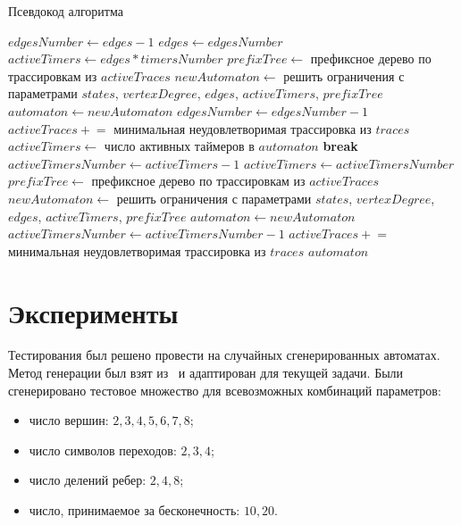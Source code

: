 \documentclass[times,specification,annotation]{itmo-student-thesis}
\begin{document}
\begin{algorithm}[!h]
\caption{Псевдокод алгоритма}\label{lst2}
\begin{algorithmic}[1]
		\State $edgesNumber \gets edges - 1$
		\Loop \label{lst:line:start3}
			\State $edges \gets edgesNumber$
			\State $activeTimers \gets edges * timersNumber$
			\State $prefixTree \gets$ префиксное дерево по трассировкам из $activeTraces$
			\State $newAutomaton \gets$ решить ограничения с параметрами $states$, $vertexDegree$, $edges$, $activeTimers$, $prefixTree$
					\State $automaton \gets newAutomaton$
					\State $edgesNumber \gets edgesNumber - 1$
				\Else
					\State $activeTraces \mathrel{+}=$ минимальная неудовлетворимая трассировка из $traces$
				\EndIf
			\Else
				\State $activeTimers \gets$ число активных таймеров в $automaton$
				\State \textbf{break}
			\EndIf
		\EndLoop \label{lst:line:end3}
		\State $activeTimersNumber \gets activeTimers - 1$
		\Loop \label{lst:line:start4}
			\State $activeTimers \gets activeTimersNumber$
			\State $prefixTree \gets$ префиксное дерево по трассировкам из $activeTraces$
			\State $newAutomaton \gets$ решить ограничения с параметрами $states$, $vertexDegree$, $edges$, $activeTimers$, $prefixTree$
					\State $automaton \gets newAutomaton$
					\State $activeTimersNumber \gets activeTimersNumber - 1$
				\Else
					\State $activeTraces \mathrel{+}=$ минимальная неудовлетворимая трассировка из $traces$
				\EndIf
			\Else
				\State\Return $automaton$
			\EndIf
		\EndLoop \label{lst:line:end4}
	\EndFunction
\end{algorithmic}
\end{algorithm}

\chapter{Эксперименты}

Тестирования был решено провести на случайных сгенерированных автоматах. Метод генерации был взят из~\cite{rti-plus} и адаптирован для текущей задачи.
Были сгенерировано тестовое множество для всевозможных комбинаций параметров:
\begin{itemize}
  \item число вершин: $2, 3, 4, 5, 6, 7, 8$;
  \item число символов переходов: $2, 3, 4$;
  \item число делений ребер: $2, 4, 8$;
  \item число, принимаемое за бесконечность: $10, 20$.
\end{itemize}
\end{document}
